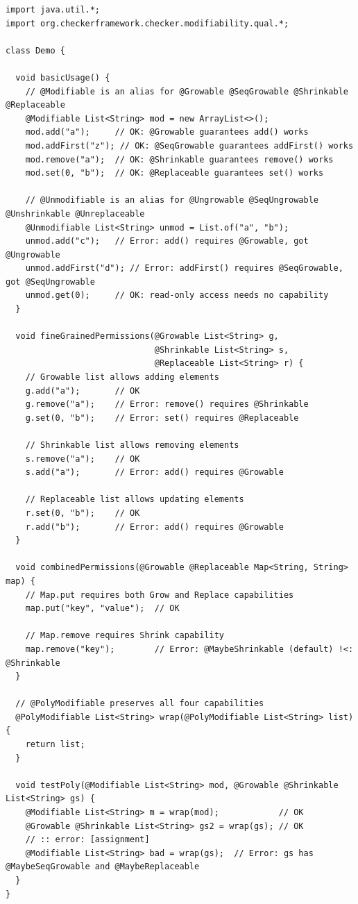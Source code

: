 \begin{Verbatim}
import java.util.*;
import org.checkerframework.checker.modifiability.qual.*;

class Demo {

  void basicUsage() {
    // @Modifiable is an alias for @Growable @SeqGrowable @Shrinkable @Replaceable
    @Modifiable List<String> mod = new ArrayList<>();
    mod.add("a");     // OK: @Growable guarantees add() works
    mod.addFirst("z"); // OK: @SeqGrowable guarantees addFirst() works
    mod.remove("a");  // OK: @Shrinkable guarantees remove() works
    mod.set(0, "b");  // OK: @Replaceable guarantees set() works

    // @Unmodifiable is an alias for @Ungrowable @SeqUngrowable @Unshrinkable @Unreplaceable
    @Unmodifiable List<String> unmod = List.of("a", "b");
    unmod.add("c");   // Error: add() requires @Growable, got @Ungrowable
    unmod.addFirst("d"); // Error: addFirst() requires @SeqGrowable, got @SeqUngrowable
    unmod.get(0);     // OK: read-only access needs no capability
  }

  void fineGrainedPermissions(@Growable List<String> g,
                              @Shrinkable List<String> s,
                              @Replaceable List<String> r) {
    // Growable list allows adding elements
    g.add("a");       // OK
    g.remove("a");    // Error: remove() requires @Shrinkable
    g.set(0, "b");    // Error: set() requires @Replaceable

    // Shrinkable list allows removing elements
    s.remove("a");    // OK
    s.add("a");       // Error: add() requires @Growable

    // Replaceable list allows updating elements
    r.set(0, "b");    // OK
    r.add("b");       // Error: add() requires @Growable
  }

  void combinedPermissions(@Growable @Replaceable Map<String, String> map) {
    // Map.put requires both Grow and Replace capabilities
    map.put("key", "value");  // OK

    // Map.remove requires Shrink capability
    map.remove("key");        // Error: @MaybeShrinkable (default) !<: @Shrinkable
  }

  // @PolyModifiable preserves all four capabilities
  @PolyModifiable List<String> wrap(@PolyModifiable List<String> list) {
    return list;
  }

  void testPoly(@Modifiable List<String> mod, @Growable @Shrinkable List<String> gs) {
    @Modifiable List<String> m = wrap(mod);            // OK
    @Growable @Shrinkable List<String> gs2 = wrap(gs); // OK
    // :: error: [assignment]
    @Modifiable List<String> bad = wrap(gs);  // Error: gs has @MaybeSeqGrowable and @MaybeReplaceable
  }
}
\end{Verbatim}

